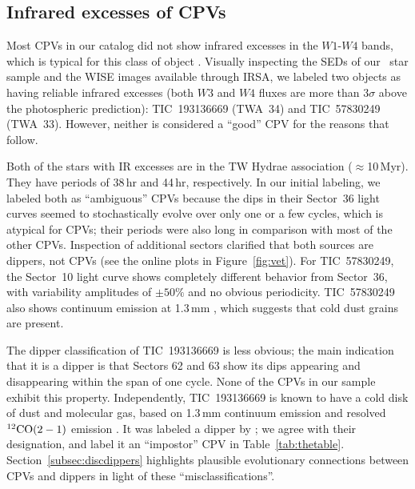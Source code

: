 \documentclass[11pt,twocolumn,tighten]{aastex63}
\begin{document}
\subsection{Infrared excesses of CPVs}
\label{subsec:irexcess}

Most CPVs in our catalog did not show infrared excesses in the
$W1$-$W4$ bands, which is typical for this class of object
\citep{2017AJ....153..152S}.  Visually inspecting the SEDs of our
\nallcands\ star sample and the WISE images available through IRSA, we
labeled two objects as having reliable infrared excesses (both $W3$
and $W4$ fluxes are more than 3$\sigma$ above the photospheric
prediction): TIC~193136669 (TWA~34) and TIC~57830249 (TWA~33).
However, neither is considered a ``good'' CPV for the reasons that
follow.

Both of the stars with IR excesses are in the TW Hydrae association
($\approx$10\,Myr).  They have periods of 38\,hr and 44\,hr,
respectively.  In our initial labeling, we labeled both as
``ambiguous'' CPVs because the dips in their Sector~36 light curves
seemed to stochastically evolve over only one or a few cycles, which
is atypical for CPVs; their periods were also long in comparison with
most of the other CPVs.  Inspection of additional sectors clarified
that both sources are dippers, not CPVs (see the online plots in
Figure~\ref{fig:vet}).  For TIC~57830249, the Sector~10 light curve
shows completely different behavior from Sector~36, with variability
amplitudes of $\pm 50\%$ and no obvious periodicity.  TIC~57830249
also shows continuum emission at 1.3\,mm \citep{2015A&A...582L...5R},
which suggests that cold dust grains are present.

The dipper classification of TIC~193136669 is less obvious; the main
indication that it is a dipper is that Sectors 62 and 63 show its dips
appearing and disappearing within the span of one cycle.  None of the
CPVs in our sample exhibit this property.  Independently,
TIC~193136669 is known to have a cold disk of dust and molecular gas,
based on 1.3\,mm continuum emission and resolved $^{12}{\rm CO}(2-1)$
emission \citep{2015A&A...582L...5R}.  It was labeled a dipper by
\citet{2022ApJS..263...14C}; we agree with their designation, and
label it an ``impostor'' CPV in Table~\ref{tab:thetable}.
Section~\ref{subsec:discdippers} highlights plausible evolutionary
connections between CPVs and dippers in light of these
``misclassifications''.
\end{document}
